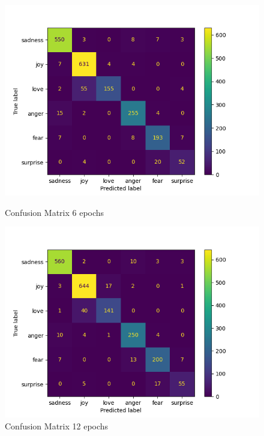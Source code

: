 \begin{figure}[h!]
    \centering
    \begin{minipage}{.5\textwidth}
        \centering
        \includegraphics[width=1\linewidth]{Figures/conf_metrix_minilm_6_epochs.png}
        \caption{Confusion Matrix 6 epochs}
        \label{fig:conf_6}
    \end{minipage}%
    \begin{minipage}{.5\textwidth}
        \centering
        \includegraphics[width=1\linewidth]{Figures/conf_metrix_minilm_12_epochs.png}
        \caption{Confusion Matrix 12 epochs}
        \label{fig:conf_12}
    \end{minipage}
    \begin{minipage}{.5\textwidth}

\end{minipage}
\end{figure}
